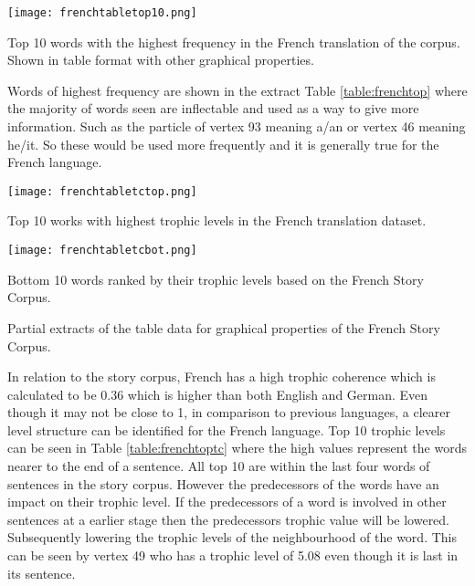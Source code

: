\begin{table}[H]
\centering
\texttt{[image: frenchtabletop10.png]}
\caption{Top 10 words with the highest frequency in the French translation of the corpus. Shown in table format with other graphical properties. }
\label{table:frenchtop}
\end{table}

Words of highest frequency are shown in the extract Table \ref{table:frenchtop} where the majority of words seen are inflectable and used as a way to give more information. Such as the particle of vertex 93 meaning a/an or vertex 46 meaning he/it. So these would be used more frequently and it is generally true for the French language.

\begin{table}[H]
\centering
\begin{subtable}{.45\textwidth}
	\centering
	\texttt{[image: frenchtabletctop.png]}
	\caption{Top 10 works with highest trophic levels in the French translation dataset.}
	\label{table:frenchtoptc}
\end{subtable}
\hfill
\begin{subtable}{.45\textwidth}
	\centering
	\texttt{[image: frenchtabletcbot.png]}
	\caption{Bottom 10 words ranked by their trophic levels based on the French Story Corpus.}
	\label{table:frenchbottc}
\end{subtable}
\caption{Partial extracts of the table data for graphical properties of the French Story Corpus.}
\end{table}

In relation to the story corpus, French has a high trophic coherence which is calculated to be $0.36$ which is higher than both English and German. Even though it may not be close to 1, in comparison to previous languages, a clearer level structure can be identified for the French language. Top 10 trophic levels can be seen in Table \ref{table:frenchtoptc} where the high values represent the words nearer to the end of a sentence. All top 10 are within the last four words of sentences in the story corpus. However the predecessors of the words have an impact on their trophic level. If the predecessors of a word is involved in other sentences at a earlier stage then the predecessors trophic value will be lowered. Subsequently lowering the trophic levels of the neighbourhood of the word. This can be seen by vertex 49 who has a trophic level of 5.08 even though it is last in its sentence.

